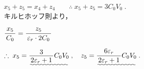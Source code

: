 \documentclass[../../../uem_phy_std_a.tex]{subfiles}
\begin{document}
\begin{enumerate}
            \myspaceb%
            $\displaystyle%
                x_5 + z_5 = x_4 + z_4
                \qquad \therefore \; x_5 + z_5 = 3C_0 V_0 \;.
            $\\
            キルヒホッフ則より，
            
            \myspaceb%
            $\displaystyle%
                \myfracc{x_5}{C_0} = \myfracc{z_5}{\varepsilon_r \cdot 2C_0} 
            $

            \myspaceb%
            $\displaystyle%
                \therefore \; x_5 = \uwave{\myfraca{3}{2\varepsilon_r + 1} C_0 V_0} \;,%
                \quad z_5 = \uwave{\myfracc{6\varepsilon_r}{2\varepsilon_r + 1} C_0 V_0} \;.
            $            
    \end{enumerate}
\end{document}
